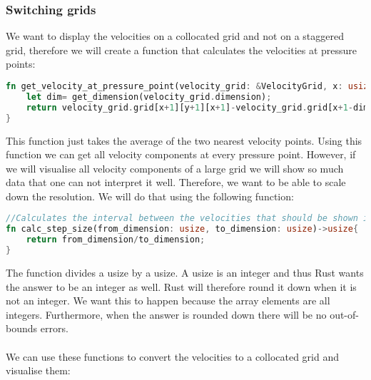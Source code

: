 \documentclass{article}
\begin{document}
\subsubsection{Switching grids}
We want to display the velocities on a collocated grid and not on a staggered grid, therefore we will create a function that calculates the velocities at pressure points:

\begin{lstlisting}[language=Rust, style=boxed, breaklines=true]
fn get_velocity_at_pressure_point(velocity_grid: &VelocityGrid, x: usize, y: usize, z: usize)->f32{
    let dim= get_dimension(velocity_grid.dimension);
    return velocity_grid.grid[x+1][y+1][x+1]-velocity_grid.grid[x+1-dim[0]][y+1-dim[1]][z+1-dim[2]];//Just take the average
}
\end{lstlisting}
This function just takes the average of the two nearest velocity points. Using this function we can get all velocity components at every pressure point. However, if we will visualise all velocity components of a large grid we will show so much data that one can not interpret it well. Therefore, we want to be able to scale down the resolution. We will do that using the following function:
\begin{lstlisting}[language=Rust, style=boxed, breaklines=true]
//Calculates the interval between the velocities that should be shown in one dimension
fn calc_step_size(from_dimension: usize, to_dimension: usize)->usize{
    return from_dimension/to_dimension;
} 
\end{lstlisting}
The function divides a usize by a usize. A usize is an integer and thus Rust wants the answer to be an integer as well. Rust will therefore round it down when it is not an integer. We want this to happen because the array elements are all integers. Furthermore, when the answer is rounded down there will be no out-of-bounds errors. 
\\ \\
We can use these functions to convert the velocities to a collocated grid and visualise them:
\end{document}
